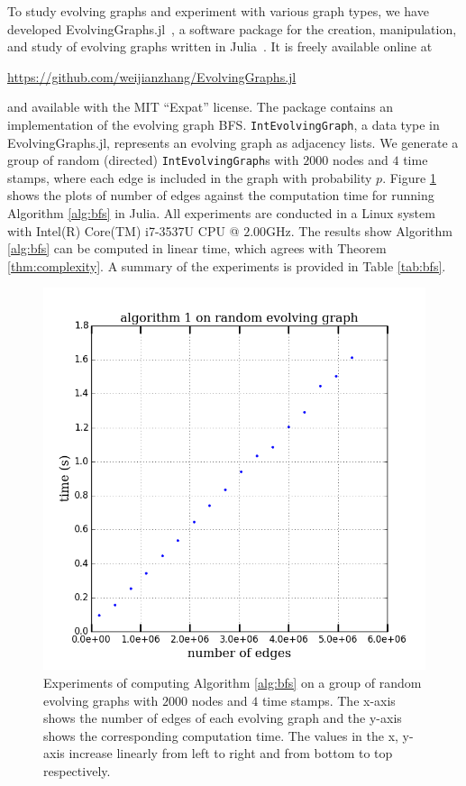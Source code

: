\documentclass[10pt,conference,compsocconf]{IEEEtran}
\theoremstyle{definition}
\begin{document}
To study evolving graphs and experiment with various graph types, we have
developed EvolvingGraphs.jl~\cite{zhang15}, a software package for the creation,
manipulation, and study of evolving graphs written in Julia~\cite{bkse12}.
It is freely available online at
\begin{center}
\url{https://github.com/weijianzhang/EvolvingGraphs.jl}
\end{center}
and available with the MIT ``Expat'' license. The package contains an implementation
of the evolving graph BFS. \texttt{IntEvolvingGraph}, a data type in EvolvingGraphs.jl,
represents an evolving graph as adjacency lists.
We generate a group of  random (directed) \texttt{IntEvolvingGraph}s with $2000$ nodes and $4$ time stamps, where each edge is included in the graph with
probability $p$.
 Figure \ref{fig:time} shows the plots of  number of edges against the computation time
for running Algorithm \ref{alg:bfs} in Julia. All experiments are conducted 
in a Linux system with Intel(R) Core(TM) i7-3537U CPU @ $2.00$GHz.
The results show Algorithm \ref{alg:bfs} can be computed in linear time, which agrees
with Theorem \ref{thm:complexity}. A summary of the experiments is provided in Table \ref{tab:bfs}.
\begin{figure}[h]
  \centering
  \includegraphics[scale=0.44]{time.png}
  \caption{Experiments of computing Algorithm \ref{alg:bfs} on a group of 
random evolving 
graphs with $2000$ nodes and $4$ time stamps. The x-axis shows the 
number of edges of each evolving graph and the y-axis shows the corresponding
computation time. The values in the x, y-axis increase linearly from left to 
right and from bottom to top respectively.}
  \label{fig:time}
\end{figure}
\end{document}

